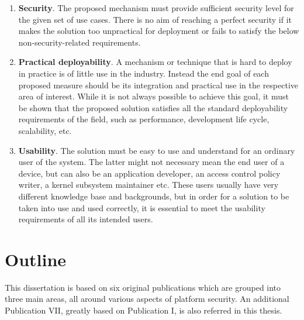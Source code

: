 \begin{enumerate}
	\item \textbf{Security}. The proposed mechanism must provide sufficient security level for the given set of use cases. There is no aim of reaching a perfect security if it makes the solution too unpractical for deployment or fails to satisfy the below non-security-related requirements.      
	\item \textbf{Practical deployability}. A mechanism or technique that is hard to deploy in practice is of little use in the industry. Instead the end goal of each proposed measure should be its integration and practical use in the respective area of interest. While it is not always possible to achieve this goal, it must be shown that the proposed solution satisfies all the standard deployability requirements of the field, such as performance, development life cycle, scalability, etc.  
	\item \textbf{Usability}.	The solution must be easy to use and understand for an ordinary user of the system. The latter might not necessary mean the end user of a device, but can also be an application developer, an access control policy writer, a kernel subsystem maintainer etc. These users usually have very different knowledge base and backgrounds, but in order for a solution to be taken into use and used correctly, it is essential to meet the usability requirements of all its intended users. 
\end{enumerate}

\section{Outline}

This dissertation is based on six original publications which are grouped into three main areas, all around various aspects of platform security. An additional Publication VII, greatly based on Publication I, is also referred in this thesis. 

